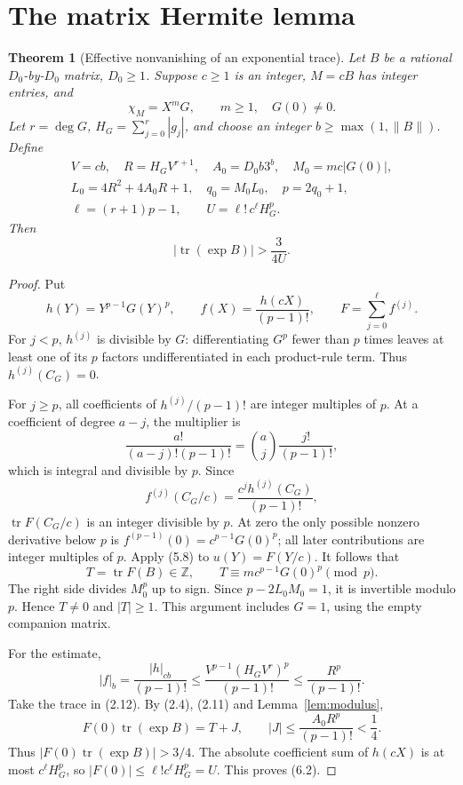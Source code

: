 \documentclass[11pt]{article}
\newtheorem{theorem}{Theorem}[section]
\theoremstyle{definition}
\newcommand{\Z}{\mathbb Z}
\newcommand{\tr}{\operatorname{tr}}
\begin{document}
\section{The matrix Hermite lemma}\label{sec:matrix-hermite}

\begin{theorem}[Effective nonvanishing of an exponential trace]
\label{thm:matrix}
Let \(B\) be a rational \(D_0\)-by-\(D_0\) matrix, \(D_0\ge1\).
Suppose \(c\ge1\) is an integer, \(M=cB\) has integer entries, and
\[
 \chi_M=X^mG,\qquad m\ge1,\quad G(0)\ne0.
\]
Let \(r=\deg G\), \(H_G=\sum_{j=0}^r|g_j|\), and choose an integer
\(b\ge\max(1,\|B\|)\). Define
\[
 \begin{gathered}
 V=cb,\quad R=H_GV^{r+1},\quad A_0=D_0b3^b,\quad
 M_0=mc|G(0)|,\\
 L_0=4R^2+4A_0R+1,\quad q_0=M_0L_0,\quad p=2q_0+1,\\
 \ell=(r+1)p-1,\qquad U=\ell!\,c^\ell H_G^p.
 \end{gathered} \tag{6.1}
\]
Then
\[
 \left|\tr(\exp B)\right|>\frac{3}{4U}. \tag{6.2}
\]
\end{theorem}
\begin{proof}
Put
\[
 h(Y)=Y^{p-1}G(Y)^p,\qquad
 f(X)=\frac{h(cX)}{(p-1)!},\qquad F=\sum_{j=0}^{\ell}f^{(j)}.
 \tag{6.3}
\]
For \(j<p\), \(h^{(j)}\) is divisible by \(G\): differentiating
\(G^p\) fewer than \(p\) times leaves at least one of its \(p\) factors
undifferentiated in each product-rule term.
Thus \(h^{(j)}(C_G)=0\).

For \(j\ge p\), all coefficients of
\(h^{(j)}/(p-1)!\) are integer multiples of \(p\).
At a coefficient of degree \(a-j\), the multiplier is
\[
 \frac{a!}{(a-j)!(p-1)!}
 =\binom aj\frac{j!}{(p-1)!},
\]
which is integral and divisible by \(p\). Since
\[
 f^{(j)}(C_G/c)=\frac{c^j h^{(j)}(C_G)}{(p-1)!},
\]
\(\tr F(C_G/c)\) is an integer divisible by \(p\).
At zero the only possible nonzero derivative below \(p\) is
\(f^{(p-1)}(0)=c^{p-1}G(0)^p\); all later contributions
are integer multiples of \(p\).
Apply (5.8) to \(u(Y)=F(Y/c)\). It follows that
\[
 T=\tr F(B)\in\Z,\qquad
 T\equiv m c^{p-1}G(0)^p\pmod p. \tag{6.4}
\]
The right side divides \(M_0^p\) up to sign.
Since \(p-2L_0M_0=1\), it is invertible modulo \(p\).
Hence \(T\ne0\) and \(|T|\ge1\).
This argument includes \(G=1\), using the empty companion matrix.

For the estimate,
\[
 |f|_b
 =\frac{|h|_{cb}}{(p-1)!}
 \le\frac{V^{p-1}(H_GV^r)^p}{(p-1)!}
 \le\frac{R^p}{(p-1)!}.
\]
Take the trace in (2.12). By (2.4), (2.11) and
Lemma~\ref{lem:modulus},
\[
 F(0)\tr(\exp B)=T+J,\qquad
 |J|\le\frac{A_0R^p}{(p-1)!}<\frac14. \tag{6.5}
\]
Thus \(|F(0)\tr(\exp B)|>3/4\).
The absolute coefficient sum of \(h(cX)\) is at most \(c^\ell H_G^p\),
so \(|F(0)|\le\ell!c^\ell H_G^p=U\).
This proves (6.2).
\end{proof}
\end{document}
